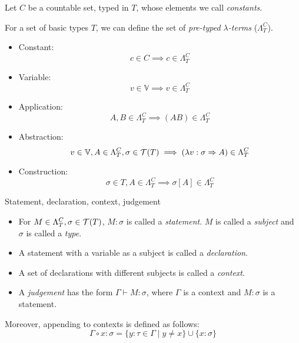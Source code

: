\documentclass[main.tex]{subfiles}
\begin{document}
\begin{defn}
    Let $C$ be a countable set, typed in $T$,
    whose elements we call \emph{constants}.

    For a set of basic types $T$, we can define the set of
    \emph{pre-typed $\lambda$-terms} ($\Lambda_T^C$).

    \begin{itemize}
        \item Constant:    \[ c \in C \implies c \in \Lambda_T^C \]
        \item Variable:    \[ v \in \mathbb{V} \implies v \in \Lambda_T^C \]
        \item Application: \[ A, B \in \Lambda_T^C \implies (AB) \in \Lambda_T^C \]
        \item Abstraction: \[ v \in \mathbb{V}, A \in \Lambda_T^C, \sigma \in \mathcal{T}( T )
                \implies (\lambda v : \sigma \Rightarrow A) \in \Lambda_T^C \]
        \item Construction: \[ \sigma \in T, A \in \Lambda_T^C
                \implies \sigma[A] \in \Lambda_T^C \]
    \end{itemize}
\end{defn}

\begin{defn}
    Statement, declaration, context, judgement
    \begin{itemize}
        \item For $M \in \Lambda_T^C, \sigma \in \mathcal{T}( T )$, $M : \sigma$ is called
            a \emph{statement}. $M$ is called a \emph{subject} and $\sigma$
            is called a \emph{type}.
        \item A statement with a variable as a subject is called a \emph{declaration}.
        \item A set of declarations with different subjects is called a \emph{context}.
        \item A \emph{judgement} has the form $\Gamma \vdash M: \sigma$, where
            $\Gamma$ is a context and $M: \sigma$ is a statement.
    \end{itemize}

    Moreover, appending to contexts is defined as follows:
    \[ \Gamma \circ x : \sigma = \{ y : \tau \in \Gamma \mid y \neq x \}
       \cup \{ x : \sigma \} \]
\end{defn}
\end{document}
